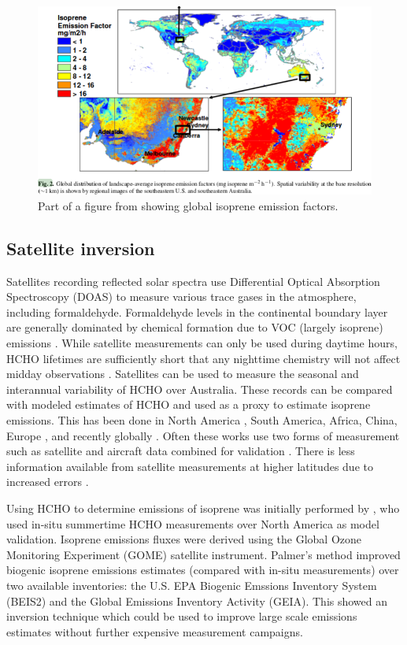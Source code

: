     \begin{figure}
      \includegraphics[width=\textwidth]{Figures/MeganIsoprene1.png}
      \caption{ Part of a figure from \citet{Guenther2006} showing global isoprene emission factors. }
      \label{LR:fig:meganisoprene}
    \end{figure}
    
    
  \subsection{Satellite inversion}
   Satellites recording reflected solar spectra use Differential Optical Absorption Spectroscopy (DOAS) to measure various trace gases in the atmosphere, including formaldehyde. 
   Formaldehyde levels in the continental boundary layer are generally dominated by chemical formation due to VOC (largely isoprene) emissions \citep{Kefauver2014}.
   While satellite measurements can only be used during daytime hours, HCHO lifetimes are sufficiently short that any nighttime chemistry will not affect midday observations \citep{Wolfe2016}.
   Satellites can be used to measure the seasonal and interannual variability of HCHO over Australia.
   These records can be compared with modeled estimates of HCHO and used as a proxy to estimate isoprene emissions.
   This has been done in North America \citep{Palmer2003, Millet2006}, South America, Africa, China, Europe \citep{Dufour2009}, and recently globally \citep{FortemsCheiney2012, Bauwens2016}.
   Often these works use two forms of measurement such as satellite and aircraft data combined for validation \citep{Marais2014}.
   There is less information available from satellite measurements at higher latitudes due to increased errors \citep{DeSmedt2015}.
   
   Using HCHO to determine emissions of isoprene was initially performed by \cite{Palmer2001, Palmer2003}, who used in-situ summertime HCHO measurements over North America as model validation.
   Isoprene emissions fluxes were derived using the Global Ozone Monitoring Experiment (GOME) satellite instrument.
   Palmer's method improved biogenic isoprene emissions estimates (compared with in-situ measurements) over two available inventories: the U.S. EPA Biogenic Emssions Inventory System (BEIS2) and the Global Emissions Inventory Activity (GEIA).
   This showed an inversion technique which could be used to improve large scale emissions estimates without further expensive measurement campaigns.
   
